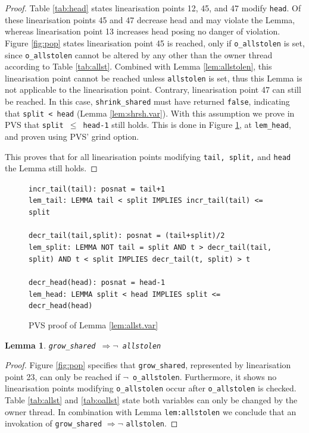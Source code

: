 \documentclass{sig-alternate-br}
\newtheorem{lemma}{Lemma}
\begin{document}
\begin{proof}
	Table \ref{tab:head} states linearisation points 12, 45, and 47 modify \texttt{head}.
	Of these linearisation points 45 and 47 decrease head and may violate the Lemma, whereas linearisation point 13 increases head posing no danger of violation.
	Figure \ref{fig:pop} states linearisation point 45 is reached, only if \texttt{o\_allstolen} is set, since \texttt{o\_allstolen} cannot be altered by any other than the owner thread according to Table \ref{tab:allst}.
	Combined with Lemma \ref{lem:allstolen}, this linearisation point cannot be reached unless \texttt{allstolen} is set, thus this Lemma is not applicable to the linearisation point.
	Contrary, linearisation point 47 can still be reached.
	In this case, \texttt{shrink\_shared} must have returned \texttt{false}, indicating that \texttt{split < head} (Lemma \ref{lem:shrsh.var}).
	With this assumption we prove in PVS that \texttt{split $\leq$ head-1} still holds.
	This is done in Figure \ref{pvs:allst.var}, at \texttt{lem\_head}, and proven using PVS' grind option.
	
	This proves that for all linearisation points modifying \texttt{tail, split,} and \texttt{head} the Lemma still holds.
\end{proof}
\begin{figure}[h]
	\texttt{incr\_tail(tail): posnat = tail+1}\\
	\texttt{lem\_tail: LEMMA tail < split IMPLIES incr\_tail(tail) <= split}\\\\	
	\texttt{decr\_tail(tail,split): posnat = (tail+split)/2}\\
	\texttt{lem\_split: LEMMA NOT tail = split AND t > decr\_tail(tail, split) AND t < split IMPLIES decr\_tail(t, split) > t}\\\\
	\texttt{decr\_head(head): posnat = head-1}\\
	\texttt{lem\_head: LEMMA split < head IMPLIES split <= decr\_head(head)}
	\caption{PVS proof of Lemma \ref{lem:allst.var}}
	\label{pvs:allst.var}
\end{figure}

\begin{lemma}
	\texttt{grow\_shared $\Rightarrow \neg$ allstolen}
	\label{lem:grshr}
\end{lemma}
\begin{proof}
	Figure \ref{fig:pop} specifies that \texttt{grow\_shared}, represented by linearisation point 23, can only be reached if \texttt{$\neg$ o\_allstolen}.
	Furthermore, it shows no linearisation points modifying \texttt{o\_allstolen} occur after \texttt{o\_allstolen} is checked.
	Table \ref{tab:allst} and \ref{tab:oallst} state both variables can only be changed by the owner thread.
	In combination with Lemma \texttt{lem:allstolen} we conclude that an invokation of \texttt{grow\_shared} $\Rightarrow \neg$ \texttt{allstolen}.
\end{proof}
\end{document}
